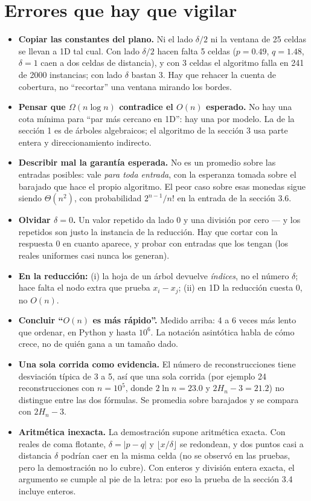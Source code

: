 \documentclass[11pt]{article}
\begin{document}
\section*{Errores que hay que vigilar}

\begin{alerta}{}
\begin{itemize}[leftmargin=14pt]
\item \textbf{Copiar las constantes del plano.} Ni el lado $\delta/2$ ni la ventana de 25 celdas se llevan
a 1D tal cual. Con lado $\delta/2$ hacen falta 5 celdas ($p=0.49$, $q=1.48$, $\delta=1$ caen a dos celdas de
distancia), y con 3 celdas el algoritmo falla en 241 de 2000 instancias; con lado $\delta$ bastan 3. Hay
que rehacer la cuenta de cobertura, no ``recortar'' una ventana mirando los bordes.
\item \textbf{Pensar que $\Omega(n\log n)$ contradice el $O(n)$ esperado.} No hay una cota mínima para
``par más cercano en 1D'': hay una por modelo. La de la sección 1 es de árboles algebraicos; el algoritmo
de la sección 3 usa parte entera y direccionamiento indirecto.
\item \textbf{Describir mal la garantía esperada.} No es un promedio sobre las entradas posibles: vale
\emph{para toda entrada}, con la esperanza tomada sobre el barajado que hace el propio algoritmo. El peor
caso sobre esas monedas sigue siendo $\Theta(n^2)$, con probabilidad $2^{n-1}/n!$ en la entrada de la
sección 3.6.
\item \textbf{Olvidar $\delta=0$.} Un valor repetido da lado $0$ y una división por cero --- y los
repetidos son justo la instancia de la reducción. Hay que cortar con la respuesta $0$ en cuanto aparece, y
probar con entradas que los tengan (los reales uniformes casi nunca los generan).
\item \textbf{En la reducción:} (i) la hoja de un árbol devuelve \emph{índices}, no el número $\delta$;
hace falta el nodo extra que prueba $x_i-x_j$; (ii) en 1D la reducción cuesta $0$, no $O(n)$.
\item \textbf{Concluir ``$O(n)$ es más rápido''.} Medido arriba: 4 a 6 veces más lento que ordenar, en
Python y hasta $10^6$. La notación asintótica habla de cómo crece, no de quién gana a un tamaño dado.
\item \textbf{Una sola corrida como evidencia.} El número de reconstrucciones tiene desviación típica de 3
a 5, así que una sola corrida (por ejemplo 24 reconstrucciones con $n=10^5$, donde $2\ln n=23.0$ y
$2H_n-3=21.2$) no distingue entre las dos fórmulas. Se promedia sobre barajados y se compara con $2H_n-3$.
\item \textbf{Aritmética inexacta.} La demostración supone aritmética exacta. Con reales de coma flotante,
$\delta=|p-q|$ y $\lfloor x/\delta\rfloor$ se redondean, y dos puntos casi a distancia $\delta$ podrían caer
en la misma celda (no se observó en las pruebas, pero la demostración no lo cubre). Con enteros y
división entera exacta, el argumento se cumple al pie de la letra: por eso la prueba de la sección 3.4
incluye enteros.
\end{itemize}
\end{alerta}
\end{document}
